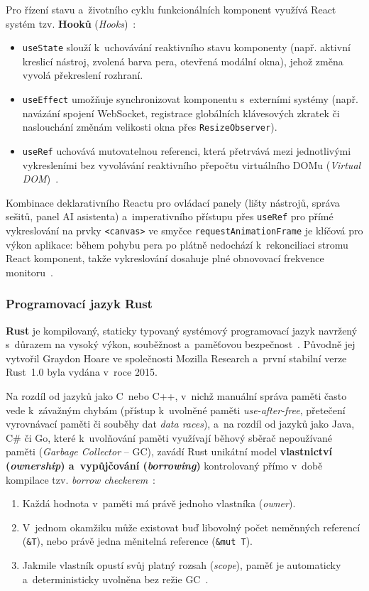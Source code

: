 \documentclass[12pt, a4paper, oneside]{article}
\begin{document}
Pro řízení stavu a~životního cyklu funkcionálních komponent využívá React systém tzv. \textbf{Hooků} (\textit{Hooks})~\cite{react_docs}:
\begin{itemize}
    \item \texttt{useState} slouží k~uchovávání reaktivního stavu komponenty (např. aktivní kreslicí nástroj, zvolená barva pera, otevřená modální okna), jehož změna vyvolá překreslení rozhraní.
    \item \texttt{useEffect} umožňuje synchronizovat komponentu s~externími systémy (např. navázání spojení WebSocket, registrace globálních klávesových zkratek či naslouchání změnám velikosti okna přes \texttt{ResizeObserver}).
    \item \texttt{useRef} uchovává mutovatelnou referenci, která přetrvává mezi jednotlivými vykresleními bez vyvolávání reaktivního přepočtu virtuálního DOMu (\textit{Virtual DOM})~\cite{react_docs}.
\end{itemize}

Kombinace deklarativního Reactu pro ovládací panely (lišty nástrojů, správa sešitů, panel AI asistenta) a~imperativního přístupu přes \texttt{useRef} pro přímé vykreslování na prvky \texttt{<canvas>} ve smyčce \texttt{requestAnimationFrame} je klíčová pro výkon aplikace: během pohybu pera po plátně nedochází k~rekonciliaci stromu React komponent, takže vykreslování dosahuje plné obnovovací frekvence monitoru~\cite{mdn_canvas, react_docs}.

\subsubsection{Programovací jazyk Rust}
\label{sec:teorie_rust}

\textbf{Rust} je kompilovaný, staticky typovaný systémový programovací jazyk navržený s~důrazem na vysoký výkon, souběžnost a~paměťovou bezpečnost~\cite{rust_book}. Původně jej vytvořil Graydon Hoare ve společnosti Mozilla Research a~první stabilní verze Rust~1.0 byla vydána v~roce 2015.

Na rozdíl od jazyků jako C~nebo C++, v~nichž manuální správa paměti často vede k~závažným chybám (přístup k~uvolněné paměti \textit{use-after-free}, přetečení vyrovnávací paměti či souběhy dat \textit{data races}), a~na rozdíl od jazyků jako Java, C\# či Go, které k~uvolňování paměti využívají běhový sběrač nepoužívané paměti (\textit{Garbage Collector} -- GC), zavádí Rust unikátní model \textbf{vlastnictví (\textit{ownership}) a~vypůjčování (\textit{borrowing})} kontrolovaný přímo v~době kompilace tzv. \textit{borrow checkerem}~\cite{rust_book}:
\begin{enumerate}
    \item Každá hodnota v~paměti má právě jednoho vlastníka (\textit{owner}).
    \item V~jednom okamžiku může existovat buď libovolný počet neměnných referencí (\texttt{\&T}), nebo právě jedna měnitelná reference (\texttt{\&mut T}).
    \item Jakmile vlastník opustí svůj platný rozsah (\textit{scope}), paměť je automaticky a~deterministicky uvolněna bez režie GC~\cite{rust_book}.
\end{enumerate}
\end{document}
